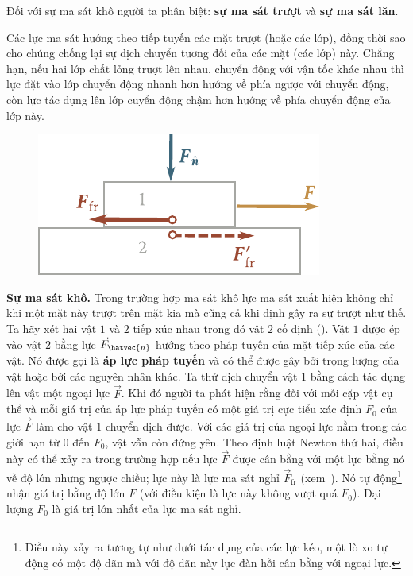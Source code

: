 Đối với sự ma sát khô người ta phân biệt: \textbf{sự ma sát trượt} và \textbf{sự ma sát lăn}.

Các lực ma sát hướng theo tiếp tuyến các mặt trượt (hoặc các lớp), đồng thời sao cho chúng chống lại sự dịch chuyển tương đối của các mặt (các lớp) này. Chẳng hạn, nếu hai lớp chất lỏng trượt lên nhau, chuyển động với vận tốc khác nhau thì lực đặt vào lớp chuyển động nhanh hơn hướng về phía ngược với chuyển động, còn lực tác dụng lên lớp cuyển động chậm hơn hướng về phía chuyển động của lớp này.

\begin{figure}[!htb]
	\begin{center}
		\includegraphics[scale=1]{figures/ch_02/fig_2_8.pdf}
		\caption[]{}
		\label{fig:2_8}
	\end{center}
\end{figure}

\textbf{Sự ma sát khô.} Trong trường hợp ma sát khô lực ma sát xuất hiện không chỉ khi một mặt này trượt trên mặt kia mà cũng cả khi định gây ra sự trượt như thế. Ta hãy xét hai vật $1$ và $2$ tiếp xúc nhau trong đó vật $2$ cố định (). Vật $1$ được ép vào vật $2$ bằng lực $\vec{F}_{\hatvec{n}}$ hướng theo pháp tuyến của mặt tiếp xúc của các vật. Nó được gọi là \textbf{áp lực pháp tuyến} và có thể được gây bởi trọng lượng của vật hoặc bởi các nguyên nhân khác. Ta thử dịch chuyển vật $1$ bằng cách tác dụng lên vật một ngoại lực $\vec{F}$. Khi đó người ta phát hiện rằng đối với mỗi cặp vật cụ thể và mỗi giá trị của áp lực pháp tuyến có một giá trị cực tiểu xác định $F_0$ của lực $\vec{F}$ làm cho vật $1$ chuyển dịch được. Với các giá trị của ngoại lực nằm trong các giới hạn từ $0$ đến $F_0$, vật vẫn còn đứng yên. Theo định luật Newton thứ hai, điều này có thể xảy ra trong trường hợp nếu lực $\vec{F}$ được cân bằng với một lực bằng nó về độ lớn nhưng ngược chiều; lực này là lực ma sát nghỉ $\vec{F}_{\text{fr}}$ (xem~). Nó tự động\footnote{Điều này xảy ra tương tự như dưới tác dụng của các lực kéo, một lò xo tự động có một độ dãn mà với độ dãn này lực đàn hồi cân bằng với ngoại lực.} nhận giá trị bằng độ lớn $F$ (với điều kiện là lực này không vượt quá $F_0$). Đại lượng $F_0$ là giá trị lớn nhất của lực ma sát nghỉ.

